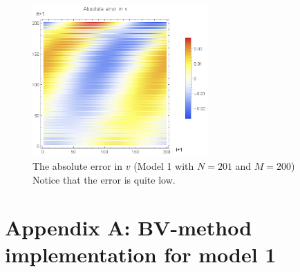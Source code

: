\documentclass{article}
\renewcommand{\(}{\left(}
\renewcommand{\)}{\right)}
\begin{document}
\begin{figure}
\centering
\includegraphics[width=0.6\textwidth]{errorVneat201x200.png}
\caption{The absolute error in $v$ (Model 1 with $N=201$ and $M=200$)\\Notice that the error is quite low.}
\label{fig:verr1big}
\end{figure}



\section*{Appendix A: BV-method implementation for model 1}

\end{document}
